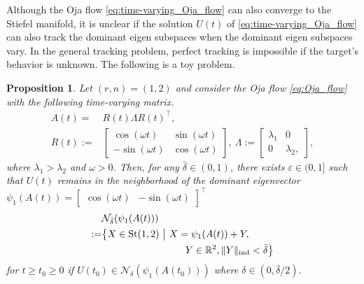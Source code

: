 \documentclass[fleqn,10pt]{SICE_FES26}
\newtheorem{prop}[thm]{Proposition}
\begin{document}
	
	Although the Oja flow \eqref{eq:time-varying_Oja_flow} can also converge to the Stiefel manifold, it is unclear if the solution $U(t)$ of \eqref{eq:time-varying_Oja_flow} can also track the dominant eigen subspaces when the dominant eigen subspaces vary. 
	In the general tracking problem, perfect tracking is impossible if the target's behavior is unknown. 
	The following is a toy problem. 
	
    \begin{prop}\label{prop:rotating_A}
    Let $(r,n) = (1,2)$ and consider the Oja flow \eqref{eq:Oja_flow} with the following time-varying matrix. 
    \begin{align*}
    A (t) = &
    R(t)
    \Lambda 
    R(t)^{\top},
    \\
    R(t) :=& \begin{bmatrix}
    \cos (\omega t) & \sin (\omega t) \\ -\sin (\omega t) & \cos (\omega t)
    \end{bmatrix},
     \ 
     \Lambda 
   := \begin{bmatrix}
    \lambda _{1} & 0 \\ 0 & \lambda _{2}, 
    \end{bmatrix}, 
    \end{align*}
    where $\lambda _{1} > \lambda _{2}$ and $\omega >0$. 
    Then, for any $\bar{\delta} \in (0,1)$, there exists $\varepsilon \in (0,1]$ such that $U(t)$ remains in the neighborhood of the dominant eigenvector $\psi _{1}(A(t)) =  \begin{bmatrix} \cos (\omega t) & -\sin (\omega t) \end{bmatrix}^{\top}$
    \begin{align*}
    & {\mathcal{N}}_{\bar{\delta}}( \psi _{1}(A(t))) 
    \\
    := & \big{\{} X \in {\mathrm{St}}(1,2) \ \big{|} \ 
    X = \psi _{1}(A(t))  + Y, 
    \\ 
    & \hspace{3cm} Y \in {\mathbb{R}}^{2}, \| Y \| _{\rm ind}< \bar{\delta}
    \big{\}}
    \end{align*}
    for $t\geq t_{0} \geq 0$ if $U(t_{0}) \in {\mathcal{N}}_{\delta }( \psi _{1}(A(t_{0})))$ where $\delta \in (0, \bar{\delta}/2)$. 
    \end{prop}
\end{document}

